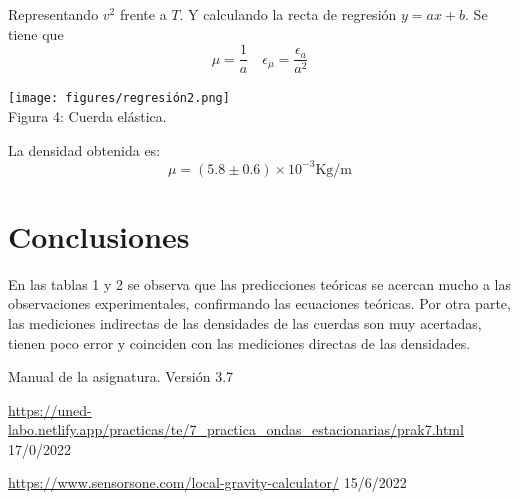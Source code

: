 \documentclass{article}
\begin{document}
\begin{multicols}{2}
  Representando $v^2$ frente a $T$. Y calculando la recta de regresión $y = ax+b$. Se tiene que
$$
\mu = \frac{1}{a} \quad \epsilon_{\mu} = \frac{\epsilon_a}{a^2}
$$
\begin{center}
  \texttt{[image: figures/regresión2.png]}\\
  Figura 4: Cuerda elástica.
\end{center}
La densidad obtenida es:
$$
\mu = (5.8\pm0.6)\times 10^{-3}\text{Kg/m}
$$
\section*{Conclusiones}
En las tablas 1 y 2 se observa que las predicciones teóricas se acercan mucho a las observaciones experimentales, confirmando las ecuaciones teóricas. Por otra parte, las mediciones indirectas de las densidades de las cuerdas son muy acertadas, tienen poco error y coinciden con las mediciones directas de las densidades.
\begin{thebibliography}{1}

  Manual de la asignatura. Versión 3.7

  \url{https://uned-labo.netlify.app/practicas/te/7_practica_ondas_estacionarias/prak7.html} 17/0/2022

  \url{https://www.sensorsone.com/local-gravity-calculator/} 15/6/2022

\end{thebibliography}
\end{multicols}
\end{document}
